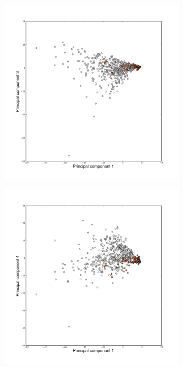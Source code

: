 \begin{landscape}
\begin{figure}
\begin{flushleft}
\begin{subfigure}[t]{0.42\textwidth}
	\end{subfigure}
	\begin{subfigure}[t]{0.42\textwidth}
	\includegraphics[width=1\textwidth]{./img/PCAncoor02.png}
	\end{subfigure}
	\begin{subfigure}[t]{0.42\textwidth}
	\includegraphics[width=1\textwidth]{./img/PCAncoor03.png}

\end{subfigure}
\end{flushleft}
\end{figure}
\end{landscape}
